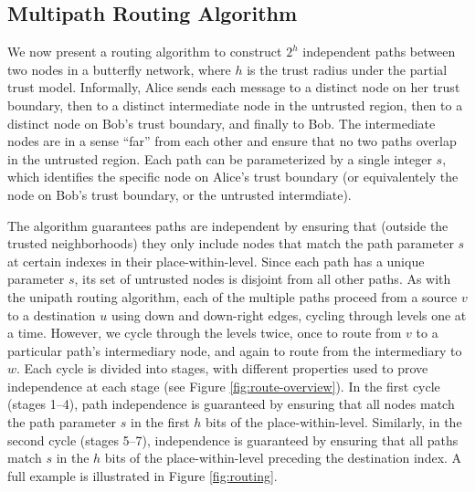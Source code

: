 \documentclass{sig-alternate-05-2015}
\begin{document}
\subsection{Multipath Routing Algorithm}

We now present a routing algorithm to construct $2^h$ independent paths
between two nodes in a butterfly network,
where $h$ is the trust radius under the partial trust model.
Informally, Alice sends each message to a distinct node on her
trust boundary, then to a distinct intermediate node in the untrusted region,
then to a distinct node on Bob's trust boundary, and finally to Bob.
The intermediate nodes are in a sense ``far'' from each other and ensure that
no two paths overlap in the untrusted region.
Each path can be parameterized by a single integer $s$, which identifies
the specific node on Alice's trust boundary
(or equivalentely the node on Bob's trust boundary, or the untrusted intermdiate).

The algorithm guarantees paths are independent by ensuring that
(outside the trusted neighborhoods)
they only include
nodes that match the path parameter $s$ at certain indexes in their
place-within-level.
Since each path has a unique parameter $s$,
its set of untrusted nodes is disjoint from all other paths.
As with the unipath routing algorithm,
each of the multiple paths proceed from a source $v$ to a destination $u$
using down and down-right edges,
cycling through levels one at a time.
However, we cycle through the levels twice, once to route from $v$ to a
particular path's intermediary node,
and again to route from the intermediary to $w$.
Each cycle is divided into stages,
with different properties used to prove independence at each stage
(see Figure \ref{fig:route-overview}).
In the first cycle (stages 1--4), path independence is guaranteed by ensuring that
all nodes match the path parameter $s$ in the first $h$ bits of the place-within-level.
Similarly, in the second cycle (stages 5--7),
independence is guaranteed by ensuring that all paths match $s$ in the
$h$ bits of the place-within-level preceding the destination index.
A full example is illustrated in Figure \ref{fig:routing}.
\end{document}
